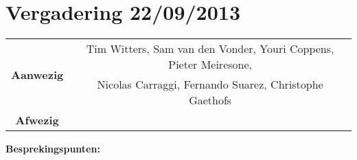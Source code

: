 \section{Vergadering 22/09/2013}

\begin{table}[htbp]
	\centering
	\begin{tabular}{c|c}
		\multirow{2}{*}{\textbf{Aanwezig}} & Tim Witters, Sam van den Vonder, Youri Coppens, Pieter Meiresone, \\
		& Nicolas Carraggi,  Fernando Suarez, Christophe Gaethofs \\
		\hline
		\textbf{Afwezig} &  \\
	\end{tabular}
\end{table}

\noindent \textbf{Besprekingspunten:} \\
